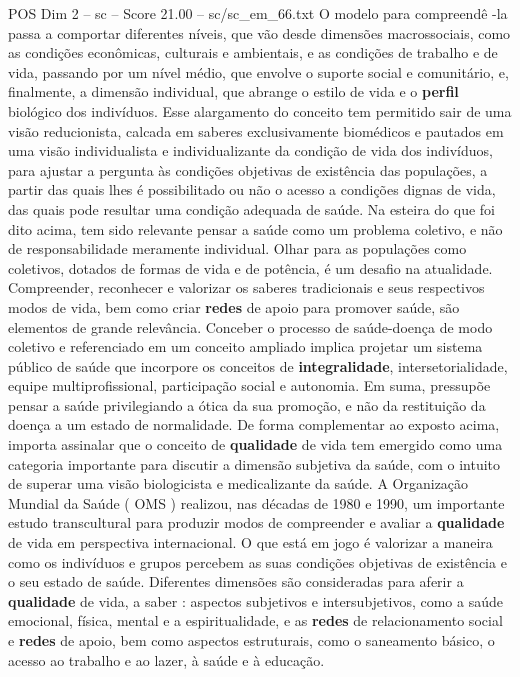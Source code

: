 \begin{textsample}{POS Dim 2 – sc – Score 21.00 – sc/sc\_em\_66.txt}
O modelo para compreendê -la passa a comportar diferentes níveis, que vão desde dimensões macrossociais, como as condições econômicas, culturais e ambientais, e as condições de trabalho e de vida, passando por um nível médio, que envolve o suporte social e comunitário, e, finalmente, a dimensão individual, que abrange o estilo de vida e o \textbf{perfil} biológico dos indivíduos.
Esse alargamento do conceito tem permitido sair de uma visão reducionista, calcada em saberes exclusivamente biomédicos e pautados em uma visão individualista e individualizante da condição de vida dos indivíduos, para ajustar a pergunta às condições objetivas de existência das populações, a partir das quais lhes é possibilitado ou não o acesso a condições dignas de vida, das quais pode resultar uma condição adequada de saúde.
Na esteira do que foi dito acima, tem sido relevante pensar a saúde como um problema coletivo, e não de responsabilidade meramente individual.
Olhar para as populações como coletivos, dotados de formas de vida e de potência, é um desafio na atualidade.
Compreender, reconhecer e valorizar os saberes tradicionais e seus respectivos modos de vida, bem como criar \textbf{redes} de apoio para promover saúde, são elementos de grande relevância.
Conceber o processo de saúde-doença de modo coletivo e referenciado em um conceito ampliado implica projetar um sistema público de saúde que incorpore os conceitos de \textbf{integralidade}, intersetorialidade, equipe multiprofissional, participação social e autonomia.
Em suma, pressupõe pensar a saúde privilegiando a ótica da sua promoção, e não da restituição da doença a um estado de normalidade.
De forma complementar ao exposto acima, importa assinalar que o conceito de \textbf{qualidade} de vida tem emergido como uma categoria importante para discutir a dimensão subjetiva da saúde, com o intuito de superar uma visão biologicista e medicalizante da saúde.
A Organização Mundial da Saúde ( OMS ) realizou, nas décadas de 1980 e 1990, um importante estudo transcultural para produzir modos de compreender e avaliar a \textbf{qualidade} de vida em perspectiva internacional.
O que está em jogo é valorizar a maneira como os indivíduos e grupos percebem as suas condições objetivas de existência e o seu estado de saúde.
Diferentes dimensões são consideradas para aferir a \textbf{qualidade} de vida, a saber : aspectos subjetivos e intersubjetivos, como a saúde emocional, física, mental e a espiritualidade, e as \textbf{redes} de relacionamento social e \textbf{redes} de apoio, bem como aspectos estruturais, como o saneamento básico, o acesso ao trabalho e ao lazer, à saúde e à educação.

\end{textsample}
